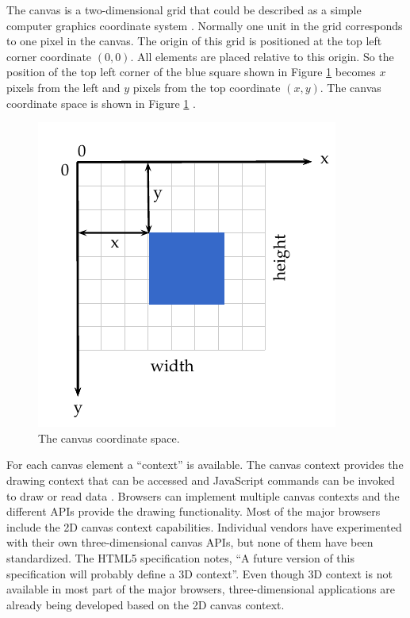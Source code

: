 The canvas is a two-dimensional grid that could be described as a simple computer graphics coordinate system \cite{Hartley2004}. Normally one unit in the grid corresponds to one pixel in the canvas. The origin of this grid is positioned at the top left corner coordinate $(0,0)$. All elements are placed relative to this origin. So the position of the top left corner of the blue square shown in Figure \ref{figure:canvas_axis} becomes $x$ pixels from the left and $y$ pixels from the top coordinate $(x,y)$. The canvas coordinate space is shown in Figure \ref{figure:canvas_axis} \cite{MDN2013}.

 \begin{figure}[!htb]
   \centering
   \includegraphics{chapters/basic_concepts/canvas_axis.pdf}
   \caption{The canvas coordinate space.}
   \label{figure:canvas_axis}
 \end{figure}

For each canvas element a ``context'' is available. The canvas context provides the drawing context that can be accessed and JavaScript commands can be invoked to draw or read data \cite{Canvas2013}. Browsers can implement multiple canvas contexts and the different APIs provide the drawing functionality. Most of the major browsers include the 2D canvas context capabilities. Individual vendors have experimented with their own three-dimensional canvas APIs, but none of them have been standardized. The HTML5 specification notes, ``A future version of this specification will probably define a 3D context''. Even though 3D context is not available in most part of the major browsers, three-dimensional applications are already being developed based on the 2D canvas context.

